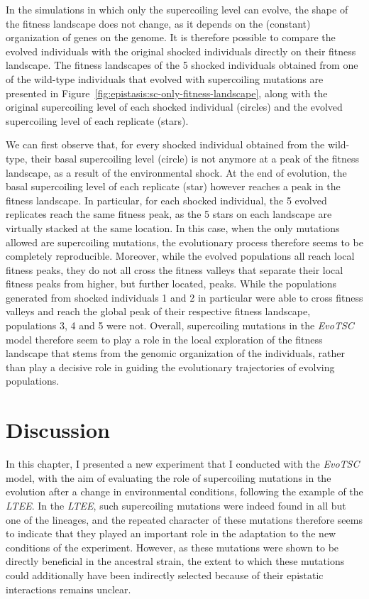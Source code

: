 In the simulations in which only the supercoiling level can evolve, the shape of the fitness landscape does not change, as it depends on the (constant) organization of genes on the genome.
It is therefore possible to compare the evolved individuals with the original shocked individuals directly on their fitness landscape.
The fitness landscapes of the 5 shocked individuals obtained from one of the wild-type individuals that evolved with supercoiling mutations are presented in Figure~\ref{fig:epistasis:sc-only-fitness-landscape}, along with the original supercoiling level of each shocked individual (circles) and the evolved supercoiling level of each replicate (stars).

We can first observe that, for every shocked individual obtained from the wild-type, their basal supercoiling level (circle) is not anymore at a peak of the fitness landscape, as a result of the environmental shock.
At the end of evolution, the basal supercoiling level of each replicate (star) however reaches a peak in the fitness landscape.
In particular, for each shocked individual, the 5 evolved replicates reach the same fitness peak, as the 5 stars on each landscape are virtually stacked at the same location.
In this case, when the only mutations allowed are supercoiling mutations, the evolutionary process therefore seems to be completely reproducible.
Moreover, while the evolved populations all reach local fitness peaks, they do not all cross the fitness valleys that separate their local fitness peaks from higher, but further located, peaks.
While the populations generated from shocked individuals 1 and 2 in particular were able to cross fitness valleys and reach the global peak of their respective fitness landscape, populations 3, 4 and 5 were not.
Overall, supercoiling mutations in the \emph{EvoTSC} model therefore seem to play a role in the local exploration of the fitness landscape that stems from the genomic organization of the individuals, rather than play a decisive role in guiding the evolutionary trajectories of evolving populations.


\section{Discussion}

In this chapter, I presented a new experiment that I conducted with the \emph{EvoTSC} model, with the aim of evaluating the role of supercoiling mutations in the evolution after a change in environmental conditions, following the example of the \emph{LTEE}.
In the \emph{LTEE}, such supercoiling mutations were indeed found in all but one of the lineages, and the repeated character of these mutations therefore seems to indicate that they played an important role in the adaptation to the new conditions of the experiment.
However, as these mutations were shown to be directly beneficial in the ancestral strain, the extent to which these mutations could additionally have been indirectly selected because of their epistatic interactions remains unclear.

